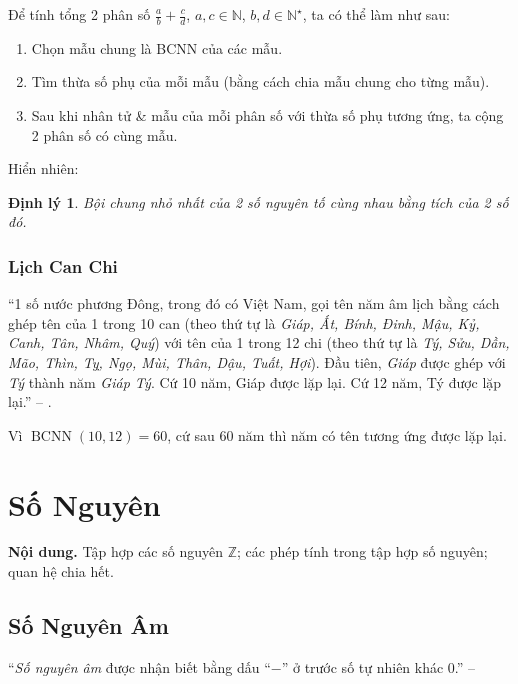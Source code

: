 \documentclass{article}
\numberwithin{equation}{section}
\newtheorem{theorem}{Định lý}[section]
\begin{document}
\begin{tcolorbox}
	Để tính tổng 2 phân số $\frac{a}{b} + \frac{c}{d}$, $a,c\in\mathbb{N}$, $b,d\in\mathbb{N}^\star$, ta có thể làm như sau:
	\begin{enumerate}
		\item Chọn mẫu chung là BCNN của các mẫu.
		\item Tìm thừa số phụ của mỗi mẫu (bằng cách chia mẫu chung cho từng mẫu).
		\item Sau khi nhân tử \& mẫu của mỗi phân số với thừa số phụ tương ứng, ta cộng 2 phân số có cùng mẫu.
	\end{enumerate}
\end{tcolorbox}
Hiển nhiên:

\begin{theorem}
	Bội chung nhỏ nhất của 2 số nguyên tố cùng nhau bằng tích của 2 số đó.
\end{theorem}

\subsubsection{Lịch Can Chi}
``1 số nước phương Đông, trong đó có Việt Nam, gọi tên năm âm lịch bằng cách ghép tên của 1 trong 10 can (theo thứ tự là \textit{Giáp, Ất, Bính, Đinh, Mậu, Kỷ, Canh, Tân, Nhâm, Quý}) với tên của 1 trong 12 chi (theo thứ tự là \textit{Tý, Sửu, Dần, Mão, Thìn, Tỵ, Ngọ, Mùi, Thân, Dậu, Tuất, Hợi}). Đầu tiên, \textit{Giáp} được ghép với \textit{Tý} thành năm \textit{Giáp Tý}. Cứ 10 năm, Giáp được lặp lại. Cứ 12 năm, Tý được lặp lại.'' -- \cite[p. 58]{Thai_Anh_Dat_Ha_Loan_Nam_Quang_Toan_6_tap_1}.

Vì $\operatorname{BCNN}(10,12) = 60$, cứ sau 60 năm thì năm có tên tương ứng được lặp lại.


\section{Số Nguyên}
\textbf{Nội dung.} Tập hợp các số nguyên $\mathbb{Z}$; các phép tính trong tập hợp số nguyên; quan hệ chia hết.

\subsection{Số Nguyên Âm}
``\emph{Số nguyên âm} được nhận biết bằng dấu ``$-$'' ở trước số tự nhiên khác 0.'' -- \cite[p. 61]{Thai_Anh_Dat_Ha_Loan_Nam_Quang_Toan_6_tap_1}
\end{document}
